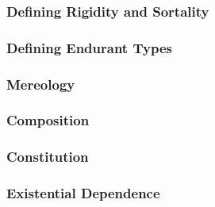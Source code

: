 \documentclass{article}
\newcommand{\BeginRigidityAndSortality}{360}
\newcommand{\EndRigidityAndSortality}{626}
\newcommand{\BeginEndurantsTypesDefinition}{628}
\newcommand{\EndEndurantsTypesDefinition}{835}
\newcommand{\BeginMereology}{837}
\newcommand{\EndMereology}{888}
\newcommand{\BeginComposition}{886}
\newcommand{\EndComposition}{914}
\newcommand{\BeginConstitution}{916}
\newcommand{\EndConstitution}{959}
\newcommand{\BeginExistentialDependence}{961}
\newcommand{\EndExistentialDependence}{983}
\begin{document}
\subsubsection{Defining Rigidity and Sortality}



\subsubsection{Defining Endurant Types}



\subsubsection{Mereology}



\subsubsection{Composition}



\subsubsection{Constitution}



\subsubsection{Existential Dependence}


\end{document}

